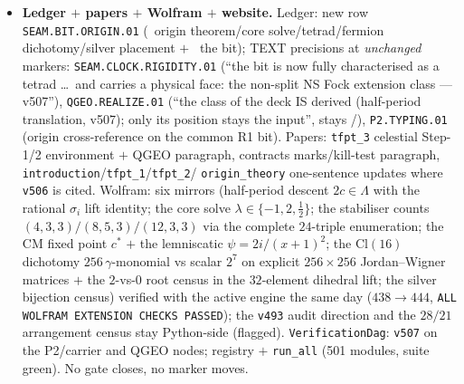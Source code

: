 \begin{itemize}[leftmargin=1.5em]
independently computed converses of ONE equivalence, no circle. \emph{Fermion dichotomy (Part B)}:
central arrangement (shift by $8$): $\tilde U^2=256\,\gamma_1\cdots\gamma_{16}\Rightarrow
U^2=(-1)^F$, nonsplit $\Z_4$, $2$ roots in the $32$-element dihedral lift (the $\Z_8$ tower); edge
arrangement (reflection $j\mapsto4{-}j$, fixed sites $=$ non-marks $=$ the silver $\{0,\infty\}$
between neighbour marks): the implementer EXISTS but $\tilde U_e^2=+2^7\cdot\mathbf1\Rightarrow
U^2=+1$, the extension SPLITS, $0$ roots, no $\Z_8$; one-particle $(\lambda^2{+}1)^8$ vs
$(\lambda^2{-}1)^8$; census: all $28$ shift-invariant $4$-sets cross (central type), all $21$
mark-free reflection-invariant sets do not; robust at $8$ sites; R-sector edge control splits too
--- the bit IS a physical extension class (Fidkowski--Kitaev-type): distinguished, but not derived
(WHICH class nature realises stays the input). \emph{Silver placement}: $\{\pm1,\pm(3{+}2\sqrt2)\}$
$=$ ``$\tau=i$ with deck $=$ a non-CM-fixed half-period translation'' (all $8$ bijections
$\to\sigma_2/\sigma_3$, never $\sigma_1$) --- the in-family witness: TAUTOLOGY REFUTED. \emph{The
one \mC\ rest (verbatim)}: the alignment bit remains a carrier datum; ``no tautology --- the origin
forces the CLASS of the deck (half-period translation), not its POSITION''. No overclaim.
\item \textbf{Ledger $+$ papers $+$ Wolfram $+$ website.} Ledger: new row
\texttt{SEAM.BIT.ORIGIN.01} (\mE\ origin theorem/core solve/tetrad/fermion dichotomy/silver
placement $+$ \mC\ the bit); TEXT precisions at \emph{unchanged} markers:
\texttt{SEAM.CLOCK.RIGIDITY.01} (``the bit is now fully characterised as a tetrad \dots\ and
carries a physical face: the non-split NS Fock extension class --- v507''),
\texttt{QGEO.REALIZE.01} (``the class of the deck IS derived (half-period translation, v507); only
its position stays the input'', stays \mC/\mO), \texttt{P2.TYPING.01} (origin cross-reference on
the common R1 bit). Papers: \texttt{tfpt\_3} celestial Step-1/2 environment $+$ QGEO paragraph,
contracts marks/kill-test paragraph, \texttt{introduction}/\texttt{tfpt\_1}/\texttt{tfpt\_2}/%
\texttt{origin\_theory} one-sentence updates where \texttt{v506} is cited. Wolfram: six mirrors
(half-period descent $2c\in\Lambda$ with the rational $\sigma_i$ lift identity; the core solve
$\lambda\in\{-1,2,\tfrac12\}$; the stabiliser counts $(4,3,3)/(8,5,3)/(12,3,3)$ via the complete
$24$-triple enumeration; the CM fixed point $c^*$ $+$ the lemniscatic $\psi=2i/(x{+}1)^2$; the
$\mathrm{Cl}(16)$ dichotomy $256\,\gamma$-monomial vs scalar $2^7$ on explicit $256{\times}256$
Jordan--Wigner matrices $+$ the $2$-vs-$0$ root census in the $32$-element dihedral lift; the
silver bijection census) verified with the active engine the same day ($438\to444$, \texttt{ALL
WOLFRAM EXTENSION CHECKS PASSED}); the \texttt{v493} audit direction and the $28/21$ arrangement
census stay Python-side (flagged). \texttt{VerificationDag}: \texttt{v507} on the P2/carrier and
QGEO nodes; registry $+$ \texttt{run\_all} (501 modules, suite green). No gate closes, no marker
moves.
\end{itemize}

